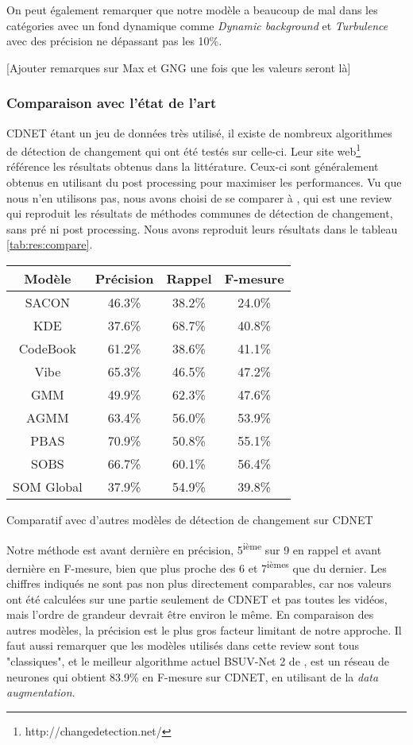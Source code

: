 	On peut également remarquer que notre modèle a beaucoup de mal dans les catégories avec un fond dynamique comme \textit{Dynamic background} et \textit{Turbulence} avec des précision ne dépassant pas les 10\%.

	[Ajouter remarques sur Max et GNG une fois que les valeurs seront là]

	\subsubsection{Comparaison avec l'état de l'art}

	CDNET étant un jeu de données très utilisé, il existe de nombreux algorithmes de détection de changement qui ont été testés sur celle-ci. Leur site web\footnote{http://changedetection.net/} référence les résultats obtenus dans la littérature. Ceux-ci sont généralement obtenus en utilisant du post processing pour maximiser les performances. Vu que nous n'en utilisons pas, nous avons choisi de se comparer à \cite{xu2016background}, qui est une review qui reproduit les résultats de méthodes communes de détection de changement, sans pré ni post processing. Nous avons reproduit leurs résultats dans le tableau \ref{tab:res:compare}.

	\begin{tableth}
    \begin{tabular}{|c|ccc|}
		\hline
		Modèle & Précision & Rappel & F-mesure\\
		\hline
		SACON & 46.3\% & 38.2\% & 24.0\%\\
		KDE & 37.6\% & 68.7\% & 40.8\%\\
		CodeBook & 61.2\% & 38.6\% & 41.1\% \\
		Vibe & 65.3\% & 46.5\% & 47.2\% \\
		GMM & 49.9\% & 62.3\% & 47.6\% \\
		AGMM & 63.4\% & 56.0\% & 53.9\% \\
		PBAS & 70.9\% & 50.8\% & 55.1\% \\
		SOBS & 66.7\% & 60.1\% & 56.4\% \\
		\hline
		SOM Global & 37.9\% & 54.9\% & 39.8\% \\
		\hline
	\end{tabular}
	\caption{Comparatif avec d'autres modèles de détection de changement sur CDNET}
	\label{tab:res:compare}
	\end{tableth}

	Notre méthode est avant dernière en précision, 5\textsuperscript{ième} sur 9 en rappel et avant dernière en F-mesure, bien que plus proche des 6 et 7\textsuperscript{ièmes} que du dernier. Les chiffres indiqués ne sont pas non plus directement comparables, car nos valeurs ont été calculées sur une partie seulement de CDNET et pas toutes les vidéos, mais l'ordre de grandeur devrait être environ le même. En comparaison des autres modèles, la précision est le plus gros facteur limitant de notre approche. Il faut aussi remarquer que les modèles utilisés dans cette review sont tous "classiques", et le meilleur algorithme actuel BSUV-Net 2 de \cite{tezcan2021bsuv}, est un réseau de neurones qui obtient 83.9\% en F-mesure sur CDNET, en utilisant de la \textit{data augmentation}.

